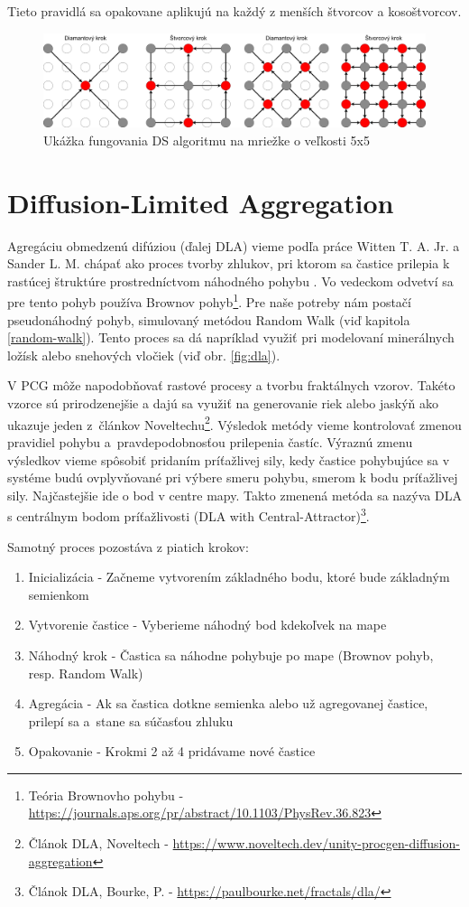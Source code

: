 Tieto pravidlá sa opakovane aplikujú na každý z menších štvorcov a kosoštvorcov.

\begin{figure}[H]
    \centering
    \includegraphics[width=0.75\linewidth]{obrazky-figures/ds-iteration.png}
    \caption{Ukážka fungovania DS algoritmu na mriežke o veľkosti 5x5}
    \label{fig:ds-steps}
\end{figure}

\section{Diffusion-Limited Aggregation}

Agregáciu obmedzenú difúziou (ďalej DLA) vieme podľa práce Witten T. A. Jr. a Sander L. M. chápať ako proces tvorby zhlukov, pri ktorom sa častice prilepia k rastúcej štruktúre prostredníctvom náhodného pohybu \cite{witten1981diffusion}. Vo vedeckom odvetví sa pre tento pohyb používa Brownov pohyb\footnote{Teória Brownovho pohybu - \url{https://journals.aps.org/pr/abstract/10.1103/PhysRev.36.823}}. Pre naše potreby nám postačí pseudonáhodný pohyb, simulovaný metódou Random Walk (viď kapitola \ref{random-walk}). Tento proces sa dá napríklad využiť pri modelovaní minerálnych ložísk alebo snehových vločiek (viď obr. \ref{fig:dla}).

V PCG môže napodobňovať rastové procesy a tvorbu fraktálnych vzorov. Takéto vzorce sú prirodzenejšie a dajú sa využiť na generovanie riek alebo jaskýň ako ukazuje jeden z~článkov Noveltechu\footnote{Článok DLA, Noveltech - \url{https://www.noveltech.dev/unity-procgen-diffusion-aggregation}}. Výsledok metódy vieme kontrolovať zmenou pravidiel pohybu a~pravdepodobnosťou prilepenia častíc. Výraznú zmenu výsledkov vieme spôsobiť pridaním príťažlivej sily, kedy častice pohybujúce sa v systéme budú ovplyvňované pri výbere smeru pohybu, smerom k bodu príťažlivej sily. Najčastejšie ide o bod v centre mapy. Takto zmenená metóda sa nazýva DLA s centrálnym bodom príťažlivosti (DLA with Central-Attractor)\footnote{Článok DLA, Bourke, P.  - \url{https://paulbourke.net/fractals/dla/}}.

Samotný proces pozostáva z piatich krokov:

\begin{enumerate}
    \item Inicializácia - Začneme vytvorením základného bodu, ktoré bude základným semienkom
    \item Vytvorenie častice - Vyberieme náhodný bod kdekoľvek na mape
    \item Náhodný krok - Častica sa náhodne pohybuje po mape (Brownov pohyb, resp. Random Walk)
    \item Agregácia - Ak sa častica dotkne semienka alebo už agregovanej častice, prilepí sa a~stane sa súčasťou zhluku
    \item Opakovanie - Krokmi 2 až 4 pridávame nové častice 
\end{enumerate}

